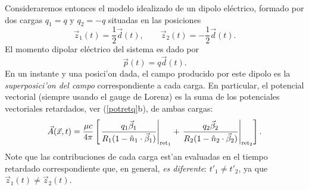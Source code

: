 Consideraremos entonces el modelo idealizado de un dipolo eléctrico, formado por dos cargas $q_1=q$ y $q_2=-q$ situadas en las posiciones
\begin{equation}
 \vec{z}_1(t)=\frac{1}{2}\vec{d}(t), \qquad \vec{z}_2(t)=-\frac{1}{2}\vec{d}(t).
\end{equation}
El momento dipolar eléctrico del sistema es dado por
\begin{equation}
 \vec{p}(t)=q\vec{d}(t).
\end{equation}
En un instante y una posici'on dada, el campo producido por este dipolo es la \textit{superposici'on del campo} correspondiente a cada carga. En particular, el potencial vectorial (siempre usando el gauge de Lorenz) es la suma de los potenciales vectoriales retardados, ver (\ref{potretq}b), de ambas cargas:
\begin{equation}
\vec{A}(\vec{x},t)=\frac{\mu c}{4\pi}\left[\left.\frac{q_1\vec{\beta}_1}{R_1(1-\hat{n}_1\cdot\vec{\beta}_1)}\right|_{{\rm ret}_1} +\left.\frac{q_2\vec{\beta}_2}{R_2(1-\hat{n}_2\cdot\vec{\beta}_2)}\right|_{{\rm ret}_2}\right].
\end{equation}
Note que las contribuciones de cada carga est'an evaluadas en el tiempo retardado correspondiente que, en general, \textit{es diferente}: $t'_1\neq t'_2$, ya que $\vec{z}_1(t)\neq\vec{z}_2(t)$.

